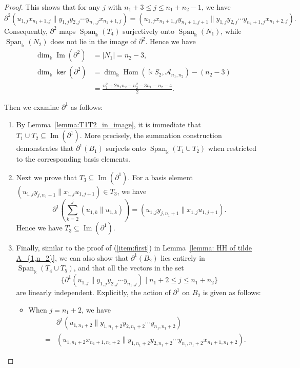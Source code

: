\documentclass[a4paper, reqno, 11pt]{amsart}
\theoremstyle{definition}
\newcommand{\opname}[1]{\operatorname{\mathsf{#1}}}
\renewcommand{\ker}{\opname{ker}\nolimits}
\begin{document}
\begin{proof}
	This shows that for any $j$ with $n_1+3 \le j \le n_1+n_2-1$, we have
	\[
	\partial^2(u_{1,j}x_{n_1+1,j} \parallel y_{1,j}y_{2,j}\cdots y_{n_1,j}x_{n_1+1,j}) = (u_{1,j}x_{n_1+1,j}y_{n_1+1,j+1} \parallel y_{1,j}y_{2,j}\cdots y_{n_1+1,j}x_{n_1+2,j}).
	\]
	Consequently, $\partial^2$ maps $\operatorname{Span}_\Bbbk(T_4)$ surjectively onto $\operatorname{Span}_\Bbbk(N_1)$, while $\operatorname{Span}_\Bbbk(N_2)$ does not lie in the image of $\partial^2$.  Hence we have 
	\[
	\begin{aligned}
		\dim_{\Bbbk}\operatorname{Im}(\partial^2)&= |N_1| = n_2-3,\\
		\dim_{\Bbbk}\ker(\partial^2) &=  \dim_{\Bbbk}\operatorname{Hom}(\Bbbk S_2, \mathcal{A}_{n_1,n_2}) - (n_2-3)\\
		&= \frac{n_1^2 + 2n_1n_2 + n_2^2 - 3n_1 - n_2 - 4}{2}.
	\end{aligned}
	\]
	
	Then we examine $\partial^1$ as follows:
	\begin{enumerate}[leftmargin=*, itemindent=0pt, labelindent=0pt, labelsep=0.5em]
		\item By Lemma~\ref{lemma:T1T2_in_image}, it is immediate that $T_1\cup T_2 \subseteq \operatorname{Im}(\partial^1)$. More precisely, the summation construction demonstrates that $\partial^1(B_1)$ surjects onto $\operatorname{Span}_\Bbbk(T_1 \cup T_2)$ when restricted to the corresponding basis elements.
		\item Next we prove that $T_3 \subseteq \operatorname{Im}(\partial^1)$. For a basis element $(u_{1,j}y_{j,n_1+1} \parallel x_{1,j}u_{1,j+1})\in T_3$, we have 
		\[
		\partial^1\left(\sum\limits_{k=2}^{j} (u_{1,k} \parallel u_{1,k})\right) =(u_{1,j}y_{j,n_1+1} \parallel x_{1,j}u_{1,j+1}).
		\]
		Hence we have $T_3 \subseteq \operatorname{Im}(\partial^1)$.
		\item Finally, similar to the proof of (\ref{item:first}) in Lemma~\ref{lemma: HH of tilde A_{1,n_2}}, we can also show that $\partial^1(B_2)$ lies entirely in $\operatorname{Span}_\Bbbk(T_4 \cup T_5)$, and that all the vectors in the set 
		\[
		\{\partial^1(u_{1,j} \parallel y_{1,j}y_{2,j}\cdots y_{n_1,j}) \mid n_1+2 \leq j \leq n_1+n_2\}
		\]
		are linearly independent. Explicitly, the action of $\partial^1$ on $B_2$ is given as follows:
		
		\begin{itemize}[label=--]
			\item When $j = n_1+2$, we have
			\[
			\begin{aligned}
				&\partial^1(u_{1,n_1+2} \parallel y_{1,n_1+2}y_{2,n_1+2}\cdots y_{n_1,n_1+2})\\
				=& (u_{1,n_1+2}x_{n_1+1,n_1+2} \parallel y_{1,n_1+2}y_{2,n_1+2}\cdots y_{n_1,n_1+2}x_{n_1+1,n_1+2}).
			\end{aligned}
			\]
			

\end{itemize}
\end{enumerate}
\end{proof}
\end{document}
